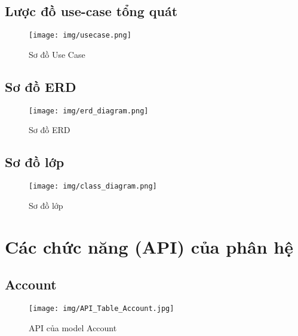\documentclass{report}
\begin{document}
\section{Lược đồ use-case tổng quát }

\begin{figure}[htp]
    \begin{center}
    	\fontsize{15}{20}\selectfont
    	\texttt{[image: img/usecase.png]}
    	\caption{Sơ đồ Use Case}
    \end{center}
\end{figure}

\pagebreak

\section{Sơ đồ ERD}
\begin{figure}[htp]
    \begin{center}
    	\texttt{[image: img/erd\_diagram.png]}
    	\linebreak
    	\caption{Sơ đồ ERD}
    \end{center}
\end{figure}
\pagebreak

\section{Sơ đồ lớp}
\begin{figure}[H]
    \begin{center}
    	\texttt{[image: img/class\_diagram.png]}
    	\linebreak
    	\caption{Sơ đồ lớp}
    \end{center}
\end{figure}


\chapter{Các chức năng (API) của phân hệ}
\section{Account}
\begin{figure}[H]
    \begin{center}
    	\texttt{[image: img/API\_Table\_Account.jpg]}
    	\linebreak
    	\caption{API của model Account}
    \end{center}
\end{figure}
\end{document}
